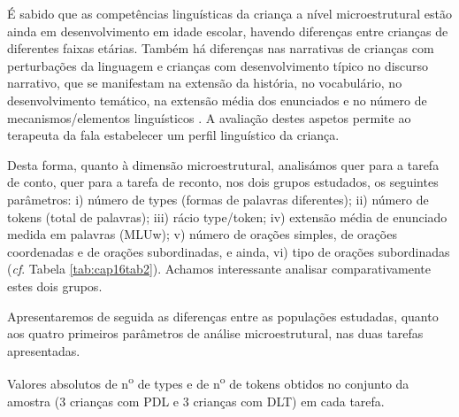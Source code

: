 \documentclass[output=paper,colorlinks,citecolor=brown,booklanguage=portuguese]{langscibook}
\begin{document}
É sabido que as competências linguísticas da criança a nível microestrutural estão ainda em desenvolvimento em idade escolar, havendo diferenças entre crianças de diferentes faixas etárias. Também há diferenças nas narrativas de crianças com perturbações da linguagem e crianças com desenvolvimento típico no discurso narrativo, que se manifestam na extensão da história, no vocabulário, no desenvolvimento temático, na extensão média dos enunciados e no número de mecanismos/elementos linguísticos \citep{Newman2006}. A avaliação destes aspetos permite ao terapeuta da fala estabelecer um perfil linguístico da criança.

Desta forma, quanto à dimensão microestrutural, analisámos quer para a tarefa de conto, quer para a tarefa de reconto, nos dois grupos estudados, os seguintes parâmetros: i) número de types (formas de palavras diferentes); ii) número de tokens (total de palavras); iii) rácio type/token; iv) extensão média de enunciado medida em palavras (MLUw); v) número de orações simples, de orações coordenadas e de orações subordinadas, e ainda, vi) tipo de orações subordinadas (\emph{cf}. Tabela \ref{tab:cap16tab2}). Achamos interessante analisar comparativamente estes dois grupos. 

Apresentaremos de seguida as diferenças entre as populações estudadas, quan\-to aos quatro primeiros parâmetros de análise microestrutural, nas duas tarefas apresentadas.
\begin{Figura}

        \dataset



    \caption{{Valores absolutos de n\textsuperscript{o} de types e de n\textsuperscript{o} de tokens obtidos no conjunto da amostra (3 crianças com PDL e 3 crianças com DLT) em cada tarefa.}}
    \label{fig:cap16fig3}
\end{Figura}
\end{document}
